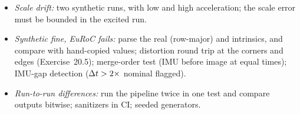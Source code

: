 \begin{solutions}
\begin{itemize}
          \item \emph{Scale drift:} two synthetic runs, with low and high acceleration; the scale error must be bounded in the excited run.
          \item \emph{Synthetic fine, EuRoC fails:} parse the real  (row-major) and intrinsics, and compare with hand-copied values; distortion round trip at the corners and
                edges (Exercise~20.5); merge-order test (IMU before image at equal times); IMU-gap detection (${\Delta t} > 2\times$ nominal flagged).
          \item \emph{Run-to-run differences:} run the pipeline twice in one test and compare outputs bitwise; sanitizers in CI; seeded generators.
        \end{itemize}
\end{solutions}
